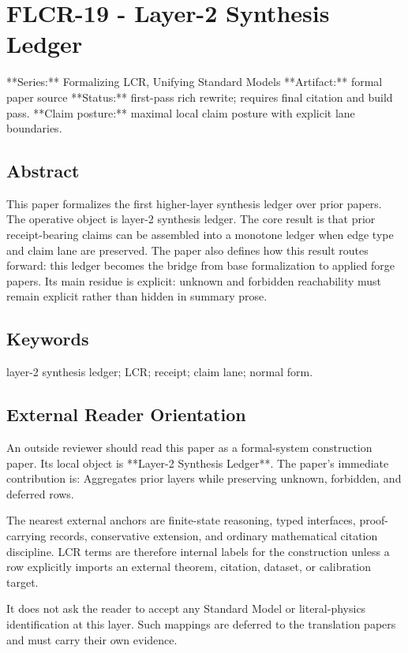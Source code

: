 \documentclass[11pt]{article}
\begin{document}
\section*{FLCR-19 - Layer-2 Synthesis Ledger}

**Series:** Formalizing LCR, Unifying Standard Models
**Artifact:** formal paper source
**Status:** first-pass rich rewrite; requires final citation and build pass.
**Claim posture:** maximal local claim posture with explicit lane boundaries.

\subsection*{Abstract}

This paper formalizes the first higher-layer synthesis ledger over prior papers. The operative object is layer-2 synthesis ledger. The core result is that prior receipt-bearing claims can be assembled into a monotone ledger when edge type and claim lane are preserved. The paper also defines how this result routes forward: this ledger becomes the bridge from base formalization to applied forge papers. Its main residue is explicit: unknown and forbidden reachability must remain explicit rather than hidden in summary prose.

\subsection*{Keywords}

layer-2 synthesis ledger; LCR; receipt; claim lane; normal form.

\subsection*{External Reader Orientation}

An outside reviewer should read this paper as a formal-system construction paper. Its local object is **Layer-2 Synthesis Ledger**. The paper's immediate contribution is: Aggregates prior layers while preserving unknown, forbidden, and deferred rows.

The nearest external anchors are finite-state reasoning, typed interfaces, proof-carrying records, conservative extension, and ordinary mathematical citation discipline. LCR terms are therefore internal labels for the construction unless a row explicitly imports an external theorem, citation, dataset, or calibration target.

It does not ask the reader to accept any Standard Model or literal-physics identification at this layer. Such mappings are deferred to the translation papers and must carry their own evidence.
\end{document}
